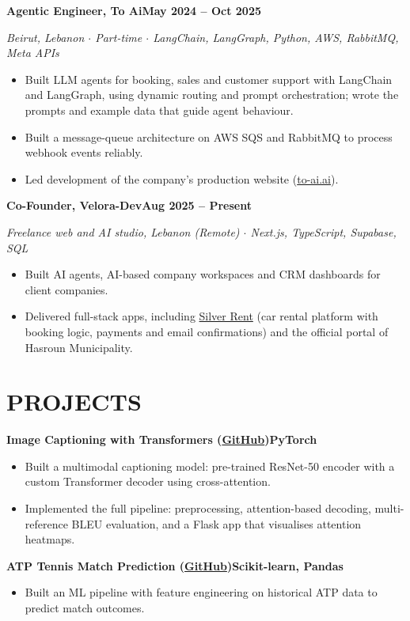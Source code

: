\documentclass[10pt, a4paper]{article}
\newcommand{\entry}[2]{\vspace{5pt}\textbf{#1}\hfill\textbf{#2}\par}
\newcommand{\sub}[1]{\textit{#1}\par}
\begin{document}
\entry{Agentic Engineer, To Ai}{May 2024 -- Oct 2025}
\sub{Beirut, Lebanon $\cdot$ Part-time $\cdot$ LangChain, LangGraph, Python, AWS, RabbitMQ, Meta APIs}
\begin{itemize}
    \item Built LLM agents for booking, sales and customer support with LangChain and LangGraph, using dynamic routing and prompt orchestration; wrote the prompts and example data that guide agent behaviour.
    \item Built a message-queue architecture on AWS SQS and RabbitMQ to process webhook events reliably.
    \item Led development of the company's production website (\href{https://to-ai.ai}{to-ai.ai}).
\end{itemize}

\entry{Co-Founder, Velora-Dev}{Aug 2025 -- Present}
\sub{Freelance web and AI studio, Lebanon (Remote) $\cdot$ Next.js, TypeScript, Supabase, SQL}
\begin{itemize}
    \item Built AI agents, AI-based company workspaces and CRM dashboards for client companies.
    \item Delivered full-stack apps, including \href{https://www.silver-rent.be}{Silver Rent} (car rental platform with booking logic, payments and email confirmations) and the official portal of Hasroun Municipality.
\end{itemize}

\section*{PROJECTS}
\entry{Image Captioning with Transformers (\href{https://github.com/Farrous05/image-caption-transformer}{GitHub})}{PyTorch}
\begin{itemize}
    \item Built a multimodal captioning model: pre-trained ResNet-50 encoder with a custom Transformer decoder using cross-attention.
    \item Implemented the full pipeline: preprocessing, attention-based decoding, multi-reference BLEU evaluation, and a Flask app that visualises attention heatmaps.
\end{itemize}

\entry{ATP Tennis Match Prediction (\href{https://github.com/Farrous05/atp-tennis-ml}{GitHub})}{Scikit-learn, Pandas}
\begin{itemize}
    \item Built an ML pipeline with feature engineering on historical ATP data to predict match outcomes.
\end{itemize}
\end{document}
